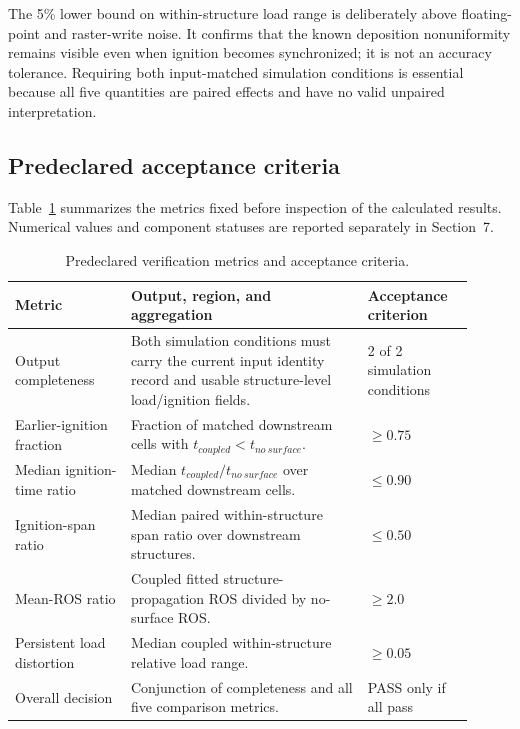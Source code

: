 The 5\% lower bound on within-structure load range is deliberately above
floating-point and raster-write noise.  It confirms that the known deposition
nonuniformity remains visible even when ignition becomes synchronized; it is
not an accuracy tolerance.  Requiring both input-matched simulation conditions is
essential because all five quantities are paired effects and have no valid
unpaired interpretation.

\subsection{Predeclared acceptance criteria}

Table~\ref{tab:acceptance-contract} summarizes the metrics fixed before
inspection of the calculated results. Numerical values and component statuses
are reported separately in Section~7.

\begin{table}[H]
\centering
\footnotesize
\caption{Predeclared verification metrics and acceptance criteria.}
\label{tab:acceptance-contract}
\begin{tabular}{@{}p{0.23\linewidth}p{0.47\linewidth}p{0.21\linewidth}@{}}
\toprule
Metric & Output, region, and aggregation & Acceptance criterion\\
\midrule
Output completeness & Both simulation conditions must carry the current input identity record and usable structure-level load/ignition fields. & 2 of 2 simulation conditions \\
Earlier-ignition fraction & Fraction of matched downstream cells with \(t_{coupled}<t_{no\ surface}\). & \(\ge0.75\) \\
Median ignition-time ratio & Median \(t_{coupled}/t_{no\ surface}\) over matched downstream cells. & \(\le0.90\) \\
Ignition-span ratio & Median paired within-structure span ratio over downstream structures. & \(\le0.50\) \\
Mean-ROS ratio & Coupled fitted structure-propagation ROS divided by no-surface ROS. & \(\ge2.0\) \\
Persistent load distortion & Median coupled within-structure relative load range. & \(\ge0.05\) \\
Overall decision & Conjunction of completeness and all five comparison metrics. & PASS only if all pass \\
\bottomrule
\end{tabular}
\end{table}

